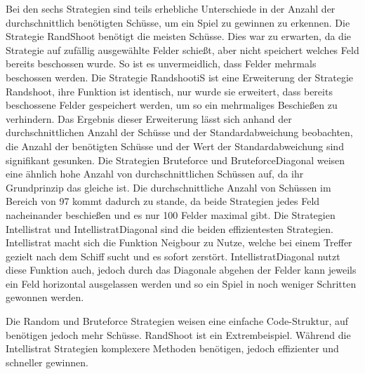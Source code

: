 Bei den sechs Strategien sind teils erhebliche Unterschiede in der Anzahl der durchschnittlich benötigten Schüsse, um ein Spiel zu gewinnen zu erkennen. Die Strategie RandShoot benötigt die meisten Schüsse. Dies war zu erwarten, da die Strategie auf zufällig ausgewählte Felder schießt, aber nicht speichert welches Feld bereits beschossen wurde. So ist es  unvermeidlich, dass Felder mehrmals beschossen werden. Die Strategie RandshootiS ist eine Erweiterung der Strategie Randshoot, ihre Funktion ist identisch, nur wurde sie 
erweitert, dass bereits beschossene Felder gespeichert werden, um so ein mehrmaliges Beschießen zu verhindern. Das Ergebnis dieser Erweiterung lässt sich anhand der durchschnittlichen 
Anzahl der Schüsse und der Standardabweichung beobachten, die Anzahl der benötigten Schüsse und der Wert der Standardabweichung sind signifikant gesunken. Die Strategien Bruteforce 
und BruteforceDiagonal weisen eine ähnlich hohe Anzahl von durchschnittlichen Schüssen auf, da ihr Grundprinzip das gleiche ist. Die durchschnittliche Anzahl von Schüssen im Bereich 
von 97 kommt dadurch zu stande, da beide Strategien jedes Feld nacheinander beschießen und es nur 100 Felder maximal gibt. Die Strategien Intellistrat und IntellistratDiagonal sind 
die beiden effizientesten Strategien. Intellistrat macht sich die Funktion Neigbour zu Nutze, welche bei einem Treffer gezielt nach dem Schiff sucht und es sofort zerstört. 
IntellistratDiagonal nutzt diese Funktion auch, jedoch durch das Diagonale abgehen der Felder kann jeweils ein Feld horizontal ausgelassen werden und so ein Spiel in noch weniger 
Schritten gewonnen werden.

Die Random und Bruteforce Strategien weisen eine einfache Code-Struktur, auf benötigen jedoch mehr Schüsse. RandShoot ist ein Extrembeispiel. Während die Intellistrat Strategien 
komplexere Methoden benötigen, jedoch effizienter und schneller gewinnen.